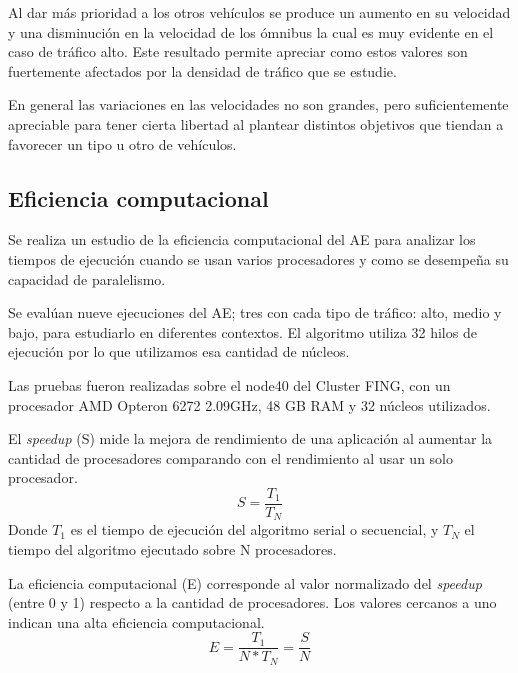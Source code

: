 Al dar más prioridad a los otros vehículos se produce un aumento en su velocidad y una disminución en la velocidad de los ómnibus la cual es muy evidente en el caso de tráfico alto. Este resultado permite apreciar como estos valores son fuertemente afectados por la densidad de tráfico que se estudie.

En general las variaciones en las velocidades no son grandes, pero suficientemente apreciable para tener cierta libertad al plantear distintos objetivos que tiendan a favorecer un tipo u otro de vehículos.


\subsection{Eficiencia computacional}

Se realiza un estudio de la eficiencia computacional del AE para analizar los tiempos de ejecución cuando se usan varios procesadores y como se desempeña su capacidad de paralelismo.

Se evalúan nueve ejecuciones del AE; tres con cada tipo de tráfico: alto, medio y bajo, para estudiarlo en diferentes contextos. El algoritmo utiliza 32 hilos de ejecución por lo que utilizamos esa cantidad de núcleos.

Las pruebas fueron realizadas sobre el node40 del Cluster FING, con un procesador AMD Opteron 6272 2.09GHz, 48 GB RAM y 32 núcleos utilizados.

El \emph{speedup} (S) mide la mejora de rendimiento de una aplicación al aumentar la cantidad de procesadores comparando con el rendimiento al usar un solo procesador.
\begin{equation}
\label{eq:funcion_speedup}
S = \frac{T_1}{T_N}
\end{equation}
Donde ${T_1}$ es el tiempo de ejecución del algoritmo serial o secuencial, y ${T_N}$ el tiempo del algoritmo ejecutado sobre N procesadores.
\newline

La eficiencia computacional (E) corresponde al valor normalizado del \emph{speedup} (entre 0 y 1) respecto a la cantidad de procesadores. Los valores cercanos a uno indican una alta eficiencia computacional.
\begin{equation}
\label{eq:funcion_eficiencia}
E = \frac{T_1}{N*T_N} = \frac{S}{N}
\end{equation}



